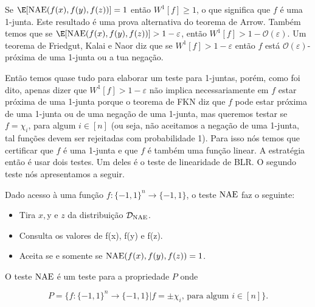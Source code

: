 Se $\E[\NAE(f(x), f(y), f(z))] = 1$ então $W^{1}[f] \geq 1$, o que significa que $f$ é uma 1-junta. Este resultado é uma prova alternativa do teorema de Arrow. Também temos que se $\E[\NAE(f(x), f(y), f(z))] > 1 - \varepsilon$, então $W^{1}[f] > 1 - \mathcal{O}(\varepsilon)$. Um teorema de Friedgut, Kalai e Naor diz que se $W^{1}[f] > 1 - \varepsilon$ então $f$ está $\mathcal{O}(\varepsilon)$-próxima de uma 1-junta ou a tua negação.

Então temos quase tudo para elaborar um teste para 1-juntas, porém, como foi dito, apenas dizer que $W^{1}[f] > 1 - \varepsilon$ não implica necessariamente em $f$ estar próxima de uma 1-junta porque o teorema de FKN diz que $f$ pode estar próxima de uma 1-junta ou de uma negação de uma 1-junta, mas queremos testar se $f = \chi_{i}$, para algum $i \in [n]$ (ou seja, não aceitamos a negação de uma 1-junta, tal funções devem ser rejeitadas com probabilidade 1). Para isso nós temos que certificar que $f$ é uma 1-junta e que $f$ é também uma função linear. A estratégia então é usar dois testes. Um deles é o teste de linearidade de BLR. O segundo teste nós apresentamos a seguir.

\begin{NAEtest} \label{NAEtest}

Dado acesso à uma função $f: \{-1, 1\}^{n} \to \{-1, 1\}$, o teste $\text{NAE}$ faz o seguinte:

\begin{itemize}

	\item Tira $x, $y e $z$ da distribuição $\mathcal{D}_{\text{NAE}}$.
	
	\item Consulta os valores de f(x), f(y) e f(z).
	
	\item Aceita se e somente se $\text{NAE}(f(x), f(y), f(z)) = 1$.

\end{itemize}

\end{NAEtest}

\begin{prop}

O teste $\text{NAE}$ é um teste para a propriedade $P$ onde

\begin{equation*}
	P = \{f: \{-1, 1\}^{n} \to \{-1, 1\} \lvert f = \pm \chi_{i} \text{, para algum } i \in [n] \}.
\end{equation*}

\end{prop}

